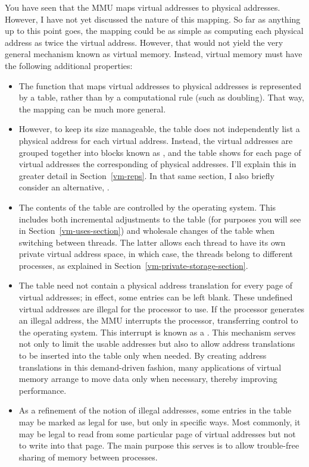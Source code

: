 You have seen that the MMU maps virtual addresses to physical
addresses.  However, I have not yet discussed the nature of this mapping.  So
far as anything up to this point goes, the mapping could be as
simple as computing each physical address as twice the virtual
address.  However, that would not yield the very general mechanism
known as virtual memory.  Instead, virtual memory must have the following
additional properties:
\begin{itemize}
\item
The function that maps virtual addresses to physical addresses is
represented by a table, rather than by a computational rule (such as
doubling).  That way, the mapping can be much more general.
\item
However, to keep its size manageable, the table does not independently
list a physical address for each virtual address.  Instead, the
virtual addresses are grouped together into blocks known as
, and the table shows for each page of virtual addresses
the corresponding  of physical addresses.  I'll explain
this in greater detail in Section~\ref{vm-reps}.
In that same section, I also briefly
consider an alternative, .
\item
The contents of the table are controlled by the operating system.
This includes both incremental adjustments to the table (for purposes
you will see in Section~\ref{vm-uses-section}) and wholesale changes of the table
when switching between threads.  The latter allows each thread to have
its own private virtual address space, in which case, the threads belong to
different processes, as explained in Section~\ref{vm-private-storage-section}.
\item
The table need not contain a physical address translation for every
page of virtual addresses; in effect, some entries can be left blank.
These undefined virtual addresses are illegal for the processor to
use.  If the processor generates an illegal address, the MMU
interrupts the processor, transferring control to the operating
system.  This interrupt is known as a .  This
mechanism serves not only to limit the usable addresses but also to
allow address translations to be inserted into the table only when
needed.  By creating address translations in this demand-driven fashion, many applications of virtual memory arrange to move data only when necessary,
thereby improving performance.
\item
As a refinement of the notion of illegal addresses, some entries in
the table may be marked as legal for use, but only in specific ways.  Most
commonly, it may be legal to read from some particular page of virtual
addresses but not to write into that page.  The main purpose this
serves is to allow trouble-free sharing of memory between processes.
\end{itemize}

